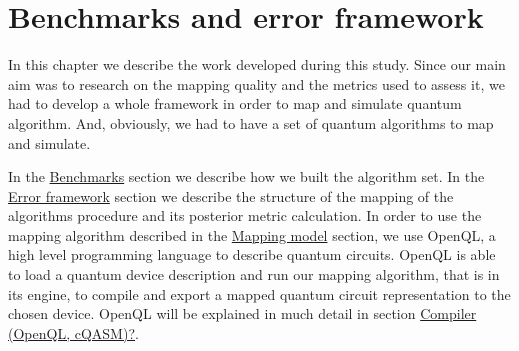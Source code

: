 
\chapter*{Benchmarks and error framework}
\label{sec:org8705db8}

In this chapter we describe the work developed during this study.
Since our main aim was to research on the mapping quality and the metrics used to assess it, we had to develop a whole framework in order to map and simulate quantum algorithm.
And, obviously, we had to have a set of quantum algorithms to map and simulate.

In the \hyperref[sec:orgd69db98]{Benchmarks} section we describe how we built the algorithm set.
In the \hyperref[sec:orgd5bd202]{Error framework} section we describe the structure of the mapping of the algorithms procedure and its posterior metric calculation.
In order to use the mapping algorithm described in the \href{chapter-3.org}{Mapping model} section, we use OpenQL, a high level programming language to describe quantum circuits.
OpenQL is able to load a quantum device description and run our mapping algorithm, that is in its engine, to compile and export a mapped quantum circuit representation to the chosen device.
OpenQL will be explained in much detail in section \hyperref[sec:orge263492]{Compiler (OpenQL, cQASM)?}.

